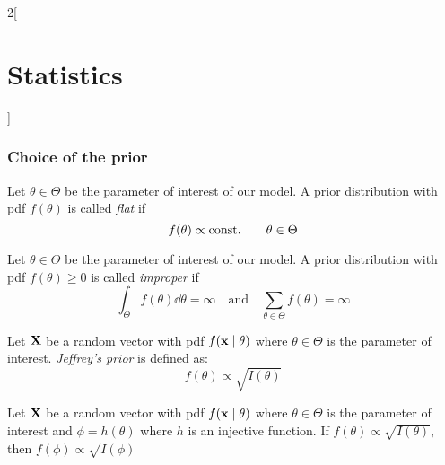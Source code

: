 \documentclass[../../../main.tex]{subfiles}
\begin{document}
\begin{multicols}{2}[\section{Statistics}]
  \subsubsection{Choice of the prior}
  \begin{definition}
    Let $\theta\in\Theta$ be the parameter of interest of our model. A prior distribution with pdf $f(\theta)$ is called \emph{flat} if $$f(\theta)\propto\text{const.}\qquad\theta\in\Theta$$
  \end{definition}
  \begin{definition}
    Let $\theta\in\Theta$ be the parameter of interest of our model. A prior distribution with pdf $f(\theta)\geq 0$ is called \emph{improper} if $$\int_\Theta f(\theta)\dd{\theta}=\infty\quad\text{and}\quad\sum_{\theta\in\Theta}f(\theta)=\infty$$
  \end{definition}
  \begin{definition}
    Let $\boldsymbol{\mathrm{X}}$ be a random vector with pdf $f(\boldsymbol{\mathrm{x}}\mid \theta)$ where $\theta\in\Theta$ is the parameter of interest. \emph{Jeffrey's prior} is defined as: $$f(\theta)\propto\sqrt{I(\theta)}$$
  \end{definition}
  \begin{proposition}
    Let $\boldsymbol{\mathrm{X}}$ be a random vector with pdf $f(\boldsymbol{\mathrm{x}}\mid \theta)$ where $\theta\in\Theta$ is the parameter of interest and $\phi=h(\theta)$ where $h$ is an injective function. If $f(\theta)\propto\sqrt{I(\theta)}$, then $f(\phi)\propto\sqrt{I(\phi)}$
  \end{proposition}

\end{multicols}
\end{document}
